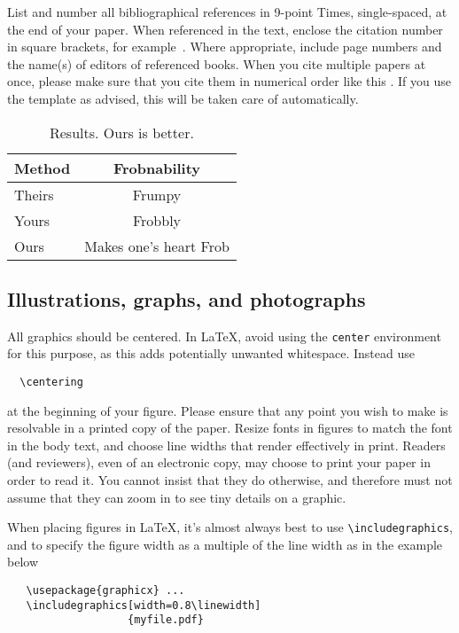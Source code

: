 \documentclass[10pt,twocolumn,letterpaper]{article}
\begin{document}
List and number all bibliographical references in 9-point Times, single-spaced, at the end of your paper.
When referenced in the text, enclose the citation number in square brackets, for
example~\cite{Authors14}.
Where appropriate, include page numbers and the name(s) of editors of referenced books.
When you cite multiple papers at once, please make sure that you cite them in numerical order like this \cite{Alpher02,Alpher03,Alpher05,Authors14b,Authors14}.
If you use the template as advised, this will be taken care of automatically.

\begin{table}
  \centering
  \begin{tabular}{@{}lc@{}}
    \toprule
    Method & Frobnability \\
    \midrule
    Theirs & Frumpy \\
    Yours & Frobbly \\
    Ours & Makes one's heart Frob\\
    \bottomrule
  \end{tabular}
  \caption{Results.   Ours is better.}
  \label{tab:example}
\end{table}

\subsection{Illustrations, graphs, and photographs}

All graphics should be centered.
In \LaTeX, avoid using the \texttt{center} environment for this purpose, as this adds potentially unwanted whitespace.
Instead use
{\small\begin{verbatim}
  \centering
\end{verbatim}}
at the beginning of your figure.
Please ensure that any point you wish to make is resolvable in a printed copy of the paper.
Resize fonts in figures to match the font in the body text, and choose line widths that render effectively in print.
Readers (and reviewers), even of an electronic copy, may choose to print your paper in order to read it.
You cannot insist that they do otherwise, and therefore must not assume that they can zoom in to see tiny details on a graphic.

When placing figures in \LaTeX, it's almost always best to use \verb+\includegraphics+, and to specify the figure width as a multiple of the line width as in the example below
{\small\begin{verbatim}
   \usepackage{graphicx} ...
   \includegraphics[width=0.8\linewidth]
                   {myfile.pdf}
\end{verbatim}
}
\end{document}
